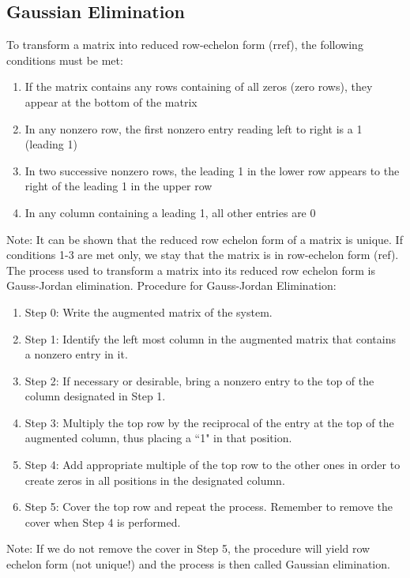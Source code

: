 \documentclass[12pt]{article}
\begin{document}
\subsection{Gaussian Elimination}
To transform a matrix into reduced row-echelon form (rref), the following conditions must be met: 
\begin{enumerate}
\item If the matrix contains any rows containing of all zeros (zero rows), they appear at the bottom of the matrix
\item In any nonzero row, the first nonzero entry reading left to right is a 1 (leading 1)
\item In two successive nonzero rows, the leading 1 in the lower row appears to the right of the leading 1 in the upper row
\item In any column containing a leading 1, all other entries are 0
\end{enumerate}
Note: It can be shown that the reduced row echelon form of a matrix is unique. \newline
If conditions 1-3 are met only, we stay that the matrix is in row-echelon form (ref). The process used to transform a matrix into its reduced row echelon form is Gauss-Jordan elimination. \newline
Procedure for Gauss-Jordan Elimination: \begin{enumerate}
\item Step 0: Write the augmented matrix of the system.
\item Step 1: Identify the left most column in the augmented matrix that contains a nonzero entry in it.
\item Step 2: If necessary or desirable, bring a nonzero entry to the top of the column designated in Step 1.
\item Step 3: Multiply the top row by the reciprocal of the entry at the top of the augmented column, thus placing a ``1" in that position.
\item Step 4: Add appropriate multiple of the top row to the other ones in order to create zeros in all positions in the designated column.
\item Step 5: Cover the top row and repeat the process. Remember to remove the cover when Step 4 is performed. \end{enumerate}
Note: If we do not remove the cover in Step 5, the procedure will yield row echelon form (not unique!) and the process is then called Gaussian elimination. 
\end{document}
